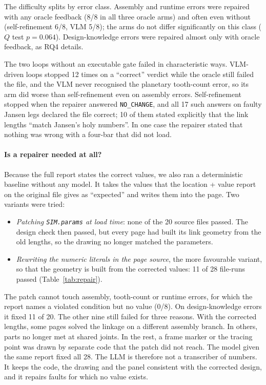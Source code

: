 The difficulty splits by error class. Assembly and runtime errors were repaired with any oracle feedback (8/8 in all three oracle arms) and often even without (self-refinement 6/8, VLM 5/8); the arms do not differ significantly on this class ($Q$ test $p=0.064$). Design-knowledge errors were repaired almost only with oracle feedback, as RQ4 details.

The two loops without an executable gate failed in characteristic ways. VLM-driven loops stopped 12 times on a ``correct'' verdict while the oracle still failed the file, and the VLM never recognised the planetary tooth-count error, so its arm did worse than self-refinement even on assembly errors. Self-refinement stopped when the repairer answered \texttt{NO\_CHANGE}, and all 17 such answers on faulty Jansen legs declared the file correct; 10 of them stated explicitly that the link lengths ``match Jansen's holy numbers''. In one case the repairer stated that nothing was wrong with a four-bar that did not load.

\paragraph{Is a repairer needed at all?} Because the full report states the correct values, we also ran a deterministic baseline without any model. It takes the values that the location + value report on the original file gives as ``expected'' and writes them into the page. Two variants were tried:
\begin{itemize}
\item \emph{Patching \texttt{SIM.params} at load time}: none of the 20 source files passed. The design check then passed, but every page had built its link geometry from the old lengths, so the drawing no longer matched the parameters.
\item \emph{Rewriting the numeric literals in the page source}, the more favourable variant, so that the geometry is built from the corrected values: 11 of 28 file-runs passed (Table~\ref{tab:repair}).
\end{itemize}
The patch cannot touch assembly, tooth-count or runtime errors, for which the report names a violated condition but no value (0/8). On design-knowledge errors it fixed 11 of 20. The other nine still failed for three reasons. With the corrected lengths, some pages solved the linkage on a different assembly branch. In others, parts no longer met at shared joints. In the rest, a frame marker or the tracing point was drawn by separate code that the patch did not reach. The model given the same report fixed all 28. The LLM is therefore not a transcriber of numbers. It keeps the code, the drawing and the panel consistent with the corrected design, and it repairs faults for which no value exists.

